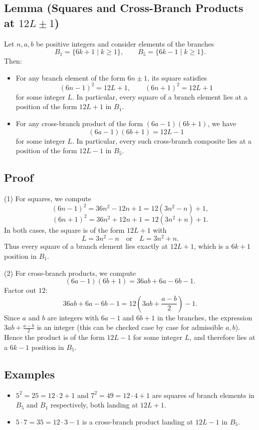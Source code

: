 \documentclass[12pt]{article}
\begin{document}
\subsection*{Lemma (Squares and Cross-Branch Products at $12L\pm1$)}
Let $n,a,b$ be positive integers and consider elements of the branches
\[
B_1 = \{6k+1\mid k\ge 1\}, \qquad B_5 = \{6k-1\mid k\ge 1\}.
\]
Then:

\begin{itemize}
\item[(1)] For any branch element of the form $6n\pm 1$, its square satisfies
\[
(6n-1)^2 = 12L + 1, \qquad (6n+1)^2 = 12L + 1
\]
for some integer $L$. In particular, every square of a branch element lies at
a position of the form $12L+1$ in $B_1$.

\item[(2)] For any cross-branch product of the form $(6a-1)(6b+1)$, we have
\[
(6a-1)(6b+1) = 12L - 1
\]
for some integer $L$. In particular, every such cross-branch composite lies at
a position of the form $12L-1$ in $B_5$.
\end{itemize}

\subsection*{Proof}
(1) For squares, we compute
\[
(6n-1)^2 = 36n^2 - 12n + 1 = 12(3n^2 - n) + 1,
\]
\[
(6n+1)^2 = 36n^2 + 12n + 1 = 12(3n^2 + n) + 1.
\]
In both cases, the square is of the form $12L+1$ with
\[
L = 3n^2 - n \quad \text{or} \quad L = 3n^2 + n.
\]
Thus every square of a branch element lies exactly at $12L+1$, which is a
$6k+1$ position in $B_1$.

(2) For cross-branch products, we compute
\[
(6a-1)(6b+1) = 36ab + 6a - 6b - 1.
\]
Factor out $12$:
\[
36ab + 6a - 6b - 1 = 12\left(3ab + \frac{a-b}{2}\right) - 1.
\]
Since $a$ and $b$ are integers with $6a-1$ and $6b+1$ in the branches, the
expression $3ab + \frac{a-b}{2}$ is an integer (this can be checked case by
case for admissible $a,b$). Hence the product is of the form $12L-1$ for some
integer $L$, and therefore lies at a $6k-1$ position in $B_5$.

\subsection*{Examples}
\begin{itemize}
\item $5^2 = 25 = 12\cdot 2 + 1$ and $7^2 = 49 = 12\cdot 4 + 1$ are squares of
branch elements in $B_5$ and $B_1$ respectively, both landing at $12L+1$.

\item $5\cdot 7 = 35 = 12\cdot 3 - 1$ is a cross-branch product landing at
$12L-1$ in $B_5$.
\end{itemize}
\end{document}
